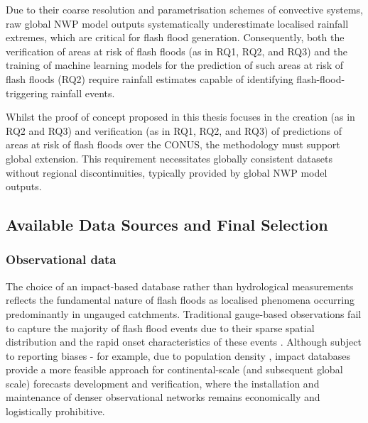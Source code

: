 Due  to their coarse resolution and parametrisation schemes of convective systems, raw global NWP model outputs systematically underestimate localised rainfall extremes, which are critical for flash flood generation. Consequently, both the verification of areas at risk of flash floods (as in RQ1, RQ2, and RQ3) and the training of machine learning models for the prediction of such areas at risk of flash floods (RQ2) require rainfall estimates capable of identifying flash-flood-triggering rainfall events. 

Whilst  the proof of concept proposed in this thesis focuses in the creation (as in RQ2 and RQ3) and verification (as in RQ1, RQ2, and RQ3) of predictions of areas at risk of flash floods over the CONUS, the methodology must support global extension. This requirement necessitates globally consistent datasets without regional discontinuities, typically provided by global NWP model outputs.


\subsection{Available Data Sources and Final Selection}

\subsubsection{Observational data}

The choice of an impact-based database rather than hydrological measurements reflects the fundamental nature of flash floods as localised phenomena occurring predominantly in ungauged catchments. Traditional gauge-based observations fail to capture the majority of flash flood events due to their sparse spatial distribution and the rapid onset characteristics of these events \citep{Gaume_2009, Gaume_2016}. Although subject to reporting biases - for example, due to population density \citep{Marjerison_2016}, impact databases provide a more feasible approach for continental-scale (and subsequent global scale) forecasts development and verification, where the installation and maintenance of denser observational networks remains economically and logistically prohibitive.

